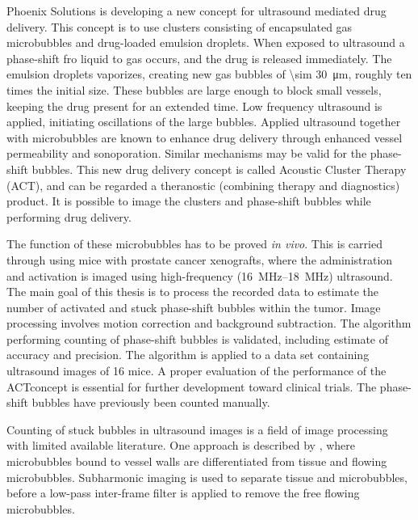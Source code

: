 Phoenix Solutions is developing a new concept for ultrasound mediated drug delivery. This concept is to use clusters consisting of encapsulated gas microbubbles and drug-loaded emulsion droplets. When exposed to ultrasound a phase-shift fro liquid to gas occurs, and the drug is released immediately. The emulsion droplets vaporizes, creating new gas bubbles of \SI{\sim 30}{\micro\meter}, roughly ten times the initial size. These bubbles are large enough to block small vessels, keeping the drug present for an extended time. Low frequency ultrasound is applied, initiating oscillations of the large bubbles. Applied ultrasound together with microbubbles are known to enhance drug delivery through enhanced vessel permeability and sonoporation\cite{VanWamel2006a}. Similar mechanisms may be valid for the phase-shift bubbles. This new drug delivery concept is called Acoustic Cluster Therapy (ACT\texttrademark), and can be regarded a theranostic (combining therapy and diagnostics) product. It is possible to image the clusters and phase-shift bubbles while performing drug delivery.

The function of these microbubbles has to be proved \textit{in vivo}. This is carried through using mice with prostate cancer xenografts, where the administration and activation is imaged using high-frequency (\SIrange{16}{18}{\mega\hertz}) ultrasound. The main goal of this thesis is to process the recorded data to estimate the number of activated and stuck phase-shift bubbles within the tumor. Image processing involves motion correction and background subtraction. The algorithm performing counting of phase-shift bubbles is validated, including estimate of accuracy and precision. The algorithm is applied to a data set containing ultrasound images of 16 mice. A proper evaluation of the performance of the ACT\texttrademark concept is essential for further development toward clinical trials. The phase-shift bubbles have previously been counted manually. 

Counting of stuck bubbles in ultrasound images is a field of image processing with limited available literature. One approach is described by \citeauthor{Needles2009}, where microbubbles bound to vessel walls are differentiated from tissue and flowing microbubbles\cite{Needles2009}. Subharmonic imaging is used to separate tissue and microbubbles, before a low-pass inter-frame filter is applied to remove the free flowing microbubbles. 







